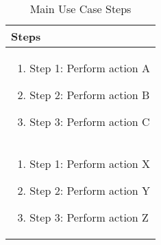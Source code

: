 \begin{table}[h]
  \centering
  \begin{tabular}{|p{8cm}|}
    \hline
    \textbf{Steps} \\
    \hline
    \begin{enumerate}
                   \item Step 1: Perform action A
                   \item Step 2: Perform action B
                   \item Step 3: Perform action C
    \end{enumerate} \\
    \hline
    \begin{enumerate}
                   \item Step 1: Perform action X
                   \item Step 2: Perform action Y
                   \item Step 3: Perform action Z
    \end{enumerate} \\
    \hline
  \end{tabular}
  \caption{Main Use Case Steps}
  \label{tab:use_case_steps}
\end{table}


